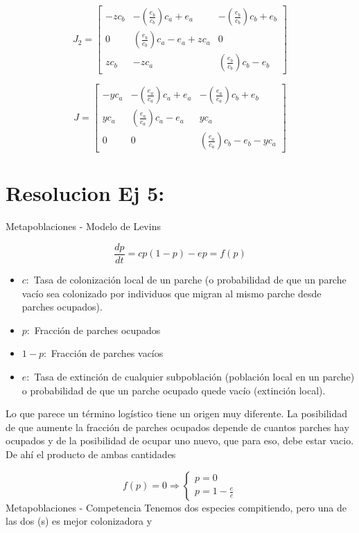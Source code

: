 \documentclass[twocolumn,aps,prl]{revtex4-1}
\begin{document}
$$
J_2 = 
\begin{bmatrix}  
    - z c_b & - (\frac{e_b}{c_b}) c_a + e_a & - (\frac{e_b}{c_b}) c_b + e_b \\
    0 & (\frac{e_b}{c_b}) c_a - e_a + z c_a & 0 \\
    z c_b & - z c_a & (\frac{e_b}{c_b}) c_b - e_b
\end{bmatrix}
$$


$$
J = 
\begin{bmatrix}  
    - y c_a & - (\frac{e_a}{c_a}) c_a + e_a & - (\frac{e_a}{c_a}) c_b + e_b \\
    y c_a & (\frac{e_a}{c_a}) c_a - e_a  & y c_a \\
    0 & 0 & (\frac{e_a}{c_a}) c_b - e_b - y c_a 
\end{bmatrix}
$$

% 
%                             
% 

\section{Resolucion Ej 5:}

Metapoblaciones - Modelo de Levins


$$\frac{d p}{d t}=c p(1-p)-e p = f(p)$$

\begin{itemize}
    \item $c:$ Tasa de colonización local de un parche (o probabilidad de que un parche vacío sea colonizado por individuos que migran al mismo parche desde parches ocupados). 
    \item $p:$ Fracción de parches ocupados
    \item $1-p:$ Fracción de parches vacíos
    \item $e:$ Tasa de extinción de cualquier subpoblación (población local en un parche) o probabilidad de que un parche ocupado quede vacío (extinción local).
\end{itemize}

Lo que parece un término logístico tiene un origen muy diferente. La posibilidad de que aumente la fracción de parches ocupados depende de cuantos parches hay ocupados y de la posibilidad de ocupar uno nuevo, que para eso, debe estar vacio. De ahí el producto de ambas cantidades

$$
f(p) = 0 \Rightarrow\left\{
\begin{array}{l}
    p=0 \\ 
    p=1-\frac{e}{c}
\end{array}
\right.
$$
Metapoblaciones - Competencia
Tenemos dos especies compitiendo, pero una de las dos (s) es mejor colonizadora y
\end{document}
